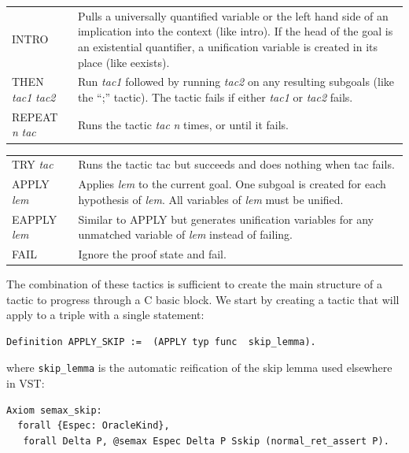 \documentclass{puthesis}
\begin{document}
\vspace{5mm}

\noindent \begin{tabular}{l@{\quad\quad}p{90mm}}
{\sf INTRO} & Pulls a universally quantified variable or the left hand
side of an
implication into the context (like {\sf intro}). If the head of the goal is an existential
quantifier, a unification variable is created in its place (like {\sf
  eexists}). \\
{\sf THEN} {\it tac1} {\it tac2} & Run {\it tac1} followed by running {\it
  tac2} on any resulting subgoals (like the ``{\sf ;}'' tactic). The tactic fails if either 
  {\it tac1} or {\it tac2} fails.\\
{\sf REPEAT} {\it n} {\it tac} & Runs the tactic {\it tac} {\it n}
times, or until it fails. \\
\end{tabular}

\noindent \begin{tabular}{l@{\quad\quad}p{90mm}}
{\sf TRY} {\it tac} & Runs the tactic {\sf tac} but succeeds and does
nothing when {\sf tac} fails.\\
{\sf APPLY} {\it lem} & Applies {\it lem} to the current goal. One
subgoal is created for each hypothesis of {\it lem}. All variables of
{\it lem} must be unified.\\
{\sf EAPPLY} {\it lem} & Similar to {\sf APPLY} but generates
unification variables for any unmatched variable of {\it lem} instead
of failing. \\
{\sf FAIL} & Ignore the proof state and fail. \\ 
\end{tabular}

The combination of these tactics is sufficient to create the main
structure of a tactic to progress through a C basic block. We start by
creating a tactic that will apply to a triple with a single statement:

\begin{lstlisting}
Definition APPLY_SKIP :=  (APPLY typ func  skip_lemma).
\end{lstlisting}
where \lstinline|skip_lemma| is the automatic reification of the 
skip lemma used elsewhere in VST:

\begin{lstlisting}
Axiom semax_skip:
  forall {Espec: OracleKind},
   forall Delta P, @semax Espec Delta P Sskip (normal_ret_assert P).
\end{lstlisting}
\end{document}
